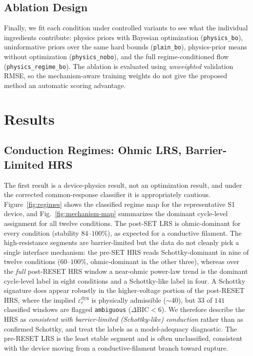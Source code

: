 \documentclass[journal]{IEEEtran}
\begin{document}
\subsection{Ablation Design}
\label{sec:ablation-design}

Finally, we fit each condition under controlled variants to see what the
individual ingredients contribute: physics priors with Bayesian optimization
(\texttt{physics\_bo}), uninformative priors over the same hard bounds
(\texttt{plain\_bo}), physics-prior means without optimization
(\texttt{physics\_nobo}), and the full regime-conditioned flow
(\texttt{physics\_regime\_bo}).  The ablation is evaluated using
\emph{unweighted} validation RMSE, so the mechanism-aware training weights do
not give the proposed method an automatic scoring advantage.

\section{Results}
\label{sec:results}

\subsection{Conduction Regimes: Ohmic LRS, Barrier-Limited HRS}
\label{sec:res-regimes}

The first result is a device-physics result, not an optimization result, and
under the corrected common-response classifier it is appropriately cautious.
Figure~\ref{fig:regimes} shows the classified regime map for the
representative S1 device, and Fig.~\ref{fig:mechanism-map} summarizes the
dominant cycle-level assignment for all twelve conditions.  The post-SET LRS is
ohmic-dominant for every condition (stability $84$--$100\%$), as expected for a
conductive filament.  The high-resistance segments are barrier-limited but the
data do not cleanly pick a single interface mechanism: the pre-SET HRS reads
Schottky-dominant in nine of twelve conditions ($60$--$100\%$, ohmic-dominant
in the other three), whereas over the \emph{full} post-RESET HRS window a
near-ohmic power-law trend is the dominant cycle-level label in eight
conditions and a Schottky-like label in four.  A Schottky signature does appear
robustly in the higher-voltage portion of the post-RESET HRS, where the implied
$\varepsilon_r^{\mathrm{dyn}}$ is physically admissible ($\sim40$), but $33$ of
$141$ classified windows are flagged \texttt{ambiguous}
($\Delta\mathrm{BIC}<6$).  We therefore describe the HRS as
\emph{consistent with barrier-limited (Schottky-like) conduction} rather than
as confirmed Schottky, and treat the labels as a model-adequacy diagnostic.
The pre-RESET LRS is the least stable segment and is often unclassified,
consistent with the device moving from a conductive-filament branch toward
rupture.
\end{document}
